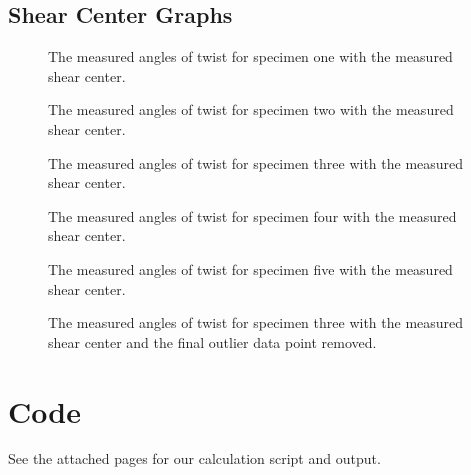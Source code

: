 \documentclass[12 pt]{report}
\begin{document}
\section{Shear Center Graphs} \label{sec:shear_center_graphs}
\begin{figure}[htbp]
	\centering
	
	\caption{The measured angles of twist for specimen one with the measured shear center.}
	\label{fig:specimen_1_sc}
\end{figure}
\begin{figure}[htbp]
	\centering
	
	\caption{The measured angles of twist for specimen two with the measured shear center.}
	\label{fig:specimen_2_sc}
\end{figure}
\begin{figure}[htbp]
	\centering
	
	\caption{The measured angles of twist for specimen three with the measured shear center.}
	\label{fig:specimen_3_sc}
\end{figure}
\begin{figure}[htbp]
	\centering
	
	\caption{The measured angles of twist for specimen four with the measured shear center.}
	\label{fig:specimen_4_sc}
\end{figure}
\begin{figure}[htbp]
	\centering
	
	\caption{The measured angles of twist for specimen five with the measured shear center.}
	\label{fig:specimen_5_sc}
\end{figure}
\begin{figure}[htbp]
	\centering
	
	\caption{The measured angles of twist for specimen three with the measured shear center and the final outlier data point removed.}
	\label{fig:specimen_3_sc_modified}
\end{figure}

\chapter{Code}
See the attached pages for our calculation script and output.
\end{document}

